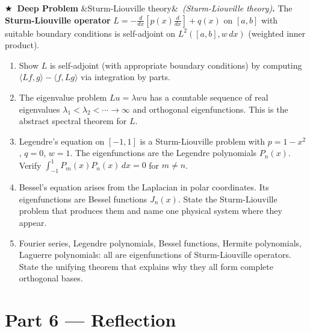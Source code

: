 \documentclass[12pt,a4paper]{article}
\newcounter{problem}
\newcounter{deepproblem}
\newenvironment{deepproblem}[1][]{\refstepcounter{deepproblem}\par\vspace{6pt}\noindent\textbf{\color{NavyBlue}$\bigstar$\ Deep Problem \thedeepproblem}\ifx&#1&\else\ \textit{(#1)}\fi\textbf{.}\enskip}{\par\vspace{4pt}}
\begin{document}
\begin{deepproblem}[Sturm-Liouville theory]
The \textbf{Sturm-Liouville operator} $L = -\frac{d}{dx}\left[p(x)\frac{d}{dx}\right] + q(x)$ on $[a,b]$ with suitable boundary conditions is self-adjoint on $L^2([a,b],w\,dx)$ (weighted inner product).
\begin{enumerate}[label=(\alph*)]
  \item Show $L$ is self-adjoint (with appropriate boundary conditions) by computing $\langle Lf,g\rangle - \langle f,Lg\rangle$ via integration by parts.
  \item The eigenvalue problem $Lu = \lambda w u$ has a countable sequence of real eigenvalues $\lambda_1<\lambda_2<\cdots\to\infty$ and orthogonal eigenfunctions. This is the abstract spectral theorem for $L$.
  \item Legendre's equation on $[-1,1]$ is a Sturm-Liouville problem with $p=1-x^2$, $q=0$, $w=1$. The eigenfunctions are the Legendre polynomials $P_n(x)$. Verify $\int_{-1}^1 P_m(x)P_n(x)\,dx = 0$ for $m\neq n$.
  \item Bessel's equation arises from the Laplacian in polar coordinates. Its eigenfunctions are Bessel functions $J_n(x)$. State the Sturm-Liouville problem that produces them and name one physical system where they appear.
  \item Fourier series, Legendre polynomials, Bessel functions, Hermite polynomials, Laguerre polynomials: all are eigenfunctions of Sturm-Liouville operators. State the unifying theorem that explains why they all form complete orthogonal bases.
\end{enumerate}
\end{deepproblem}

\section{Part 6 \texorpdfstring{---}{--} Reflection}
\end{document}
